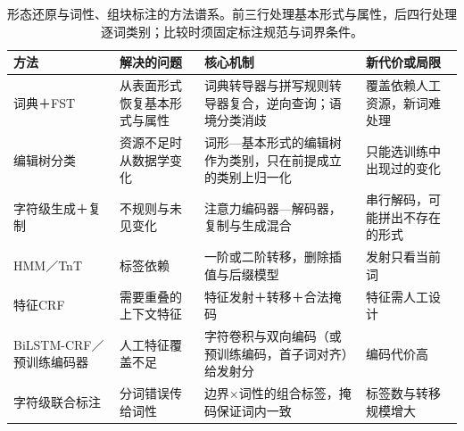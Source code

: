 \begin{table}[htbp]
  \centering
  \begin{tabularx}{\linewidth}{@{}>{\raggedright\arraybackslash}p{27mm}>{\raggedright\arraybackslash}p{34mm}XX@{}}
    \toprule
    方法&解决的问题&核心机制&新代价或局限\\
    \midrule
    词典＋FST&从表面形式恢复基本形式与属性&词典转导器与拼写规则转导器复合，逆向查询；语境分类消歧&覆盖依赖人工资源，新词难处理\\
    编辑树分类&资源不足时从数据学变化&词形—基本形式的编辑树作为类别，只在前提成立的类别上归一化&只能选训练中出现过的变化\\
    字符级生成＋复制&不规则与未见变化&注意力编码器—解码器，复制与生成混合&串行解码，可能拼出不存在的形式\\
    HMM／TnT&标签依赖&一阶或二阶转移，删除插值与后缀模型&发射只看当前词\\
    特征CRF&需要重叠的上下文特征&特征发射＋转移＋合法掩码&特征需人工设计\\
    BiLSTM-CRF／预训练编码器&人工特征覆盖不足&字符卷积与双向编码（或预训练编码，首子词对齐）给发射分&编码代价高\\
    字符级联合标注&分词错误传给词性&边界×词性的组合标签，掩码保证词内一致&标签数与转移规模增大\\
    \bottomrule
  \end{tabularx}
  \caption{形态还原与词性、组块标注的方法谱系。前三行处理基本形式与属性，后四行处理逐词类别；比较时须固定标注规范与词界条件。}
  \label{tab:nlp-analysis-morph-pos-methods}
\end{table}
